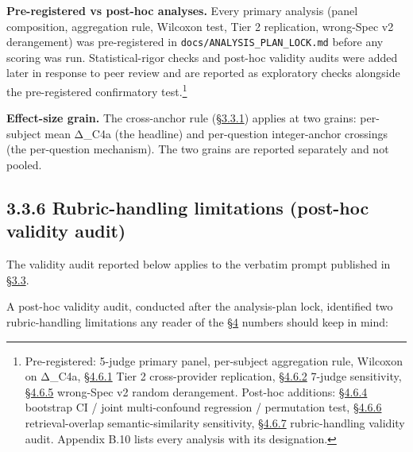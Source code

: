\textbf{Pre-registered vs post-hoc analyses.} Every primary analysis
(panel composition, aggregation rule, Wilcoxon test, Tier 2 replication,
wrong-Spec v2 derangement) was pre-registered in
\texttt{docs/ANALYSIS\_PLAN\_LOCK.md} before any scoring was run.
Statistical-rigor checks and post-hoc validity audits were added later
in response to peer review and are reported as exploratory checks
alongside the pre-registered confirmatory test.\footnote{Pre-registered:
  5-judge primary panel, per-subject aggregation rule, Wilcoxon on
  Δ\_C4a, \hyperref[cross-provider-response-generation-tier-2-replication]{§4.6.1} Tier 2 cross-provider replication, \hyperref[judge-panel-sensitivity-5-judge-primary-vs-7-judge]{§4.6.2} 7-judge
  sensitivity, \hyperref[wrong-spec-derangement-protocol-sensitivity]{§4.6.5} wrong-Spec v2 random derangement. Post-hoc
  additions: \hyperref[statistical-rigor-checks-on-the-headline-gradient]{§4.6.4} bootstrap CI / joint multi-confound regression /
  permutation test, \hyperref[retrieval-overlap-sensitivity-semantic-similarity-matching-k-variation]{§4.6.6} retrieval-overlap semantic-similarity
  sensitivity, \hyperref[rubric-handling-limitations-post-hoc-validity-audit-1]{§4.6.7} rubric-handling validity audit. Appendix B.10
  lists every analysis with its designation.}

\textbf{Effect-size grain.} The cross-anchor rule (\hyperref[score-interpretation]{§3.3.1}) applies at
two grains: per-subject mean Δ\_C4a (the headline) and per-question
integer-anchor crossings (the per-question mechanism). The two grains
are reported separately and not pooled.

\hypertarget{rubric-handling-limitations-post-hoc-validity-audit}{%
\subsection{3.3.6 Rubric-handling limitations (post-hoc validity
audit)}\label{rubric-handling-limitations-post-hoc-validity-audit}}

The validity audit reported below applies to the verbatim prompt
published in \hyperref[scoring-rubric-with-calibrated-llm-judge-panel]{§3.3}.

A post-hoc validity audit, conducted after the analysis-plan lock,
identified two rubric-handling limitations any reader of the \hyperref[results]{§4} numbers
should keep in mind:

